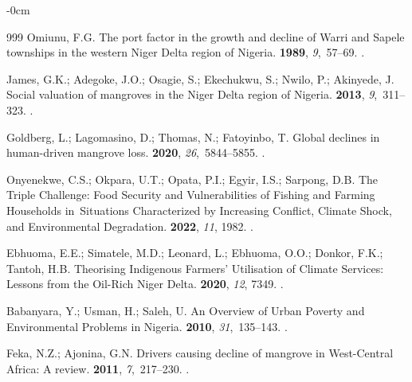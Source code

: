 \documentclass[jmse,article,accept,pdftex,moreauthors]{Definitions/mdpi}
\begin{document}
\begin{adjustwidth}{-\extralength}{0cm}
\begin{thebibliography}{999}
Omiunu, F.G.
\newblock The port factor in the growth and decline of Warri and Sapele
  townships in the western Niger Delta region of Nigeria.
 {\bf 1989}, {\em 9},~57--69.
.

James, G.K.; Adegoke, J.O.; Osagie, S.; Ekechukwu, S.; Nwilo, P.; Akinyede, J.
\newblock Social valuation of mangroves in the Niger Delta region of Nigeria.
 {\bf 2013},
  {\em 9},~311--323.
.

Goldberg, L.; Lagomasino, D.; Thomas, N.; Fatoyinbo, T.
\newblock Global declines in human-driven mangrove loss.
 {\bf 2020}, {\em 26},~5844--5855.
.

Onyenekwe, C.S.; Okpara, U.T.; Opata, P.I.; Egyir, I.S.; Sarpong, D.B.
\newblock The Triple Challenge: Food Security and Vulnerabilities of Fishing
  and Farming Households in~Situations Characterized by Increasing Conflict,
  Climate Shock, and Environmental Degradation.
 {\bf 2022}, {\em 11}, 1982.
.

Ebhuoma, E.E.; Simatele, M.D.; Leonard, L.; Ebhuoma, O.O.; Donkor, F.K.;
  Tantoh, H.B.
\newblock Theorising Indigenous Farmers’ Utilisation of Climate Services:
  Lessons from the Oil-Rich Niger Delta.
 {\bf 2020}, {\em 12}, 7349.
.

Babanyara, Y.; Usman, H.; Saleh, U.
\newblock An Overview of Urban Poverty and Environmental Problems in Nigeria.
 {\bf 2010}, {\em 31},~135--143.
.

Feka, N.Z.; Ajonina, G.N.
\newblock Drivers causing decline of mangrove in West-Central Africa: A review.
 {\bf 2011},
  {\em 7},~217--230.
.


\end{thebibliography}
\end{adjustwidth}
\end{document}
